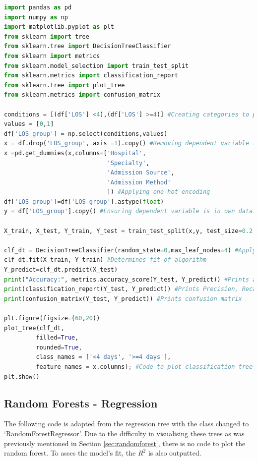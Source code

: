 \documentclass[../thesis.tex]{subfiles}
\begin{document}
\begin{lstlisting}[language = python]
import pandas as pd
import numpy as np
import matplotlib.pyplot as plt
from sklearn import tree
from sklearn.tree import DecisionTreeClassifier
from sklearn import metrics
from sklearn.model_selection import train_test_split
from sklearn.metrics import classification_report
from sklearn.tree import plot_tree
from sklearn.metrics import confusion_matrix

conditions = [(df['LOS'] <4),(df['LOS'] >=4)] #Creating categories to predict
values = [0,1]
df['LOS_group'] = np.select(conditions,values)
x = df.drop('LOS_group', axis =1).copy() #Removing dependent variable from analysis
x =pd.get_dummies(x,columns=['Hospital',
                             'Specialty',
                             'Admission Source',
                             'Admission Method'
                             ]) #Applying one-hot encoding
df['LOS_group']=df['LOS_group'].astype(float)
y = df['LOS_group'].copy() #Ensuring dependent variable is in own dataframe

X_train, X_test, Y_train, Y_test = train_test_split(x,y, test_size=0.2, random_state=0) #Creating training and testing data

clf_dt = DecisionTreeClassifier(random_state=0,max_leaf_nodes=4) #Applying the algorithm
clf_dt.fit(X_train, Y_train) #Determines fit of algorithm
Y_predict=clf_dt.predict(X_test)
print("Accuracy:", metrics.accuracy_score(Y_test, Y_predict)) #Prints accuracy score
print(classification_report(Y_test, Y_predict)) #Prints Precision, Recall and F1 Scores
print(confusion_matrix(Y_test, Y_predict)) #Prints confusion matrix

plt.figure(figsize=(60,20))
plot_tree(clf_dt,
         filled=True,
         rounded=True,
         class_names = ['<4 days', '>=4 days'],
         feature_names = x.columns); #Code to plot classification tree visual
plt.show() 
\end{lstlisting}

\subsection{Random Forests - Regression}
The following code is adapted from the regression tree with the class changed to `RandomForestRegressor'. Due to the difficulty in visualising these trees as was previously mentioned in Section \ref{sec:randomforest}, there is no code to plot the random forest. To asses the model's fit, the $R^{2}$ is also outputted.
\end{document}
